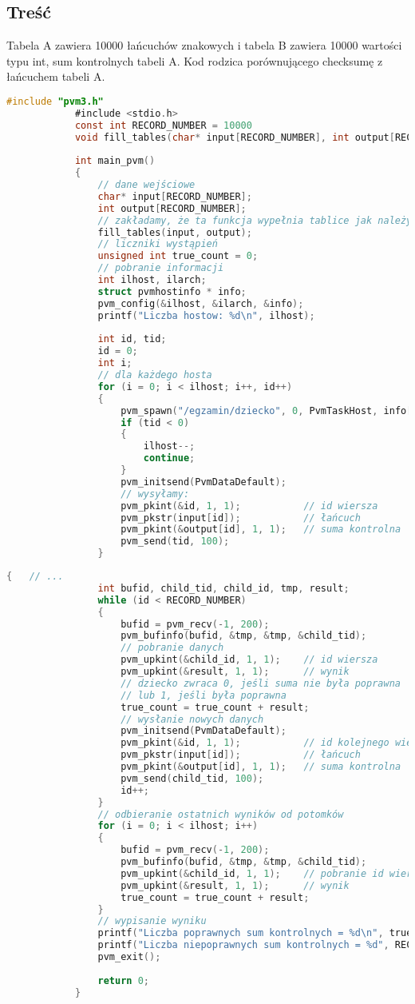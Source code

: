 		\subsection{Treść}
		Tabela A zawiera 10000 łańcuchów znakowych i tabela B zawiera 10000 wartości typu int, sum kontrolnych tabeli A. Kod rodzica porównującego checksumę z łańcuchem tabeli A.
			\begin{lstlisting}[language=C]
			#include "pvm3.h"
			#include <stdio.h>
			const int RECORD_NUMBER = 10000
			void fill_tables(char* input[RECORD_NUMBER], int output[RECORD_NUMBER]);
			
			int main_pvm()
			{
				// dane wejściowe
				char* input[RECORD_NUMBER];
				int output[RECORD_NUMBER];
				// zakładamy, że ta funkcja wypełnia tablice jak należy
				fill_tables(input, output);
				// liczniki wystąpień
				unsigned int true_count = 0;
				// pobranie informacji
				int ilhost, ilarch;
				struct pvmhostinfo * info;
				pvm_config(&ilhost, &ilarch, &info);
				printf("Liczba hostow: %d\n", ilhost);
				
				int id, tid;
				id = 0;
				int i;
				// dla każdego hosta
				for (i = 0; i < ilhost; i++, id++)
				{
					pvm_spawn("/egzamin/dziecko", 0, PvmTaskHost, info[i].hi_name, 1, &tid);
					if (tid < 0)
					{
						ilhost--;
						continue;
					}
					pvm_initsend(PvmDataDefault);
					// wysyłamy:
					pvm_pkint(&id, 1, 1);			// id wiersza
					pvm_pkstr(input[id]);			// łańcuch
					pvm_pkint(&output[id], 1, 1);	// suma kontrolna
					pvm_send(tid, 100);
				}
			\end{lstlisting}
			\newpage
			\begin{lstlisting}[language=C]
			{	// ...
				int bufid, child_tid, child_id, tmp, result;
				while (id < RECORD_NUMBER)
				{
					bufid = pvm_recv(-1, 200);
					pvm_bufinfo(bufid, &tmp, &tmp, &child_tid);
					// pobranie danych
					pvm_upkint(&child_id, 1, 1);	// id wiersza
					pvm_upkint(&result, 1, 1);		// wynik
					// dziecko zwraca 0, jeśli suma nie była poprawna
					// lub 1, jeśli była poprawna
					true_count = true_count + result;
					// wysłanie nowych danych
					pvm_initsend(PvmDataDefault);
					pvm_pkint(&id, 1, 1);			// id kolejnego wiersza
					pvm_pkstr(input[id]);			// łańcuch
					pvm_pkint(&output[id], 1, 1);	// suma kontrolna
					pvm_send(child_tid, 100);
					id++;
				}
				// odbieranie ostatnich wyników od potomków
				for (i = 0; i < ilhost; i++)
				{
					bufid = pvm_recv(-1, 200);
					pvm_bufinfo(bufid, &tmp, &tmp, &child_tid);
					pvm_upkint(&child_id, 1, 1);	// pobranie id wiersza
					pvm_upkint(&result, 1, 1);		// wynik
					true_count = true_count + result;
				}
				// wypisanie wyniku
				printf("Liczba poprawnych sum kontrolnych = %d\n", true_count);
				printf("Liczba niepoprawnych sum kontrolnych = %d", RECORD_NUMBER - true_count);
				pvm_exit();
				
				return 0;
			}
			\end{lstlisting}
			\newpage
